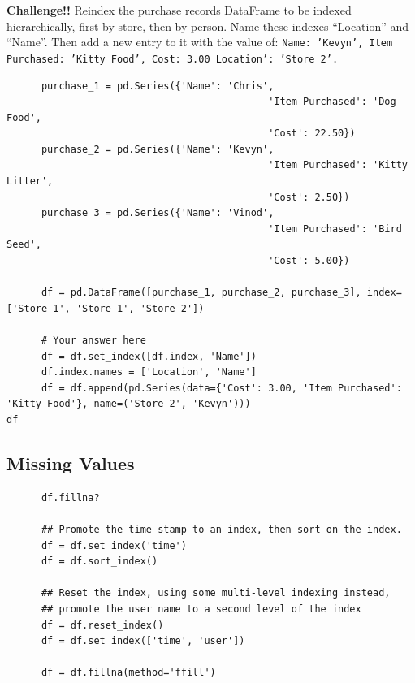 \documentclass[11pt]{article}
\begin{document}
    {\bf Challenge!!}
    Reindex the purchase records DataFrame to be indexed
    hierarchically, first by store, then by person. Name these indexes
    ``Location'' and ``Name''. Then add a new entry to it with the value
    of: 
    {\tt Name: 'Kevyn', Item Purchased: 'Kitty Food', Cost: 3.00 Location': 'Store 2'.}
    \begin{lstlisting}
      purchase_1 = pd.Series({'Name': 'Chris',
                                             'Item Purchased': 'Dog Food',
                                             'Cost': 22.50})
      purchase_2 = pd.Series({'Name': 'Kevyn',
                                             'Item Purchased': 'Kitty Litter',
                                             'Cost': 2.50})
      purchase_3 = pd.Series({'Name': 'Vinod',
                                             'Item Purchased': 'Bird Seed',
                                             'Cost': 5.00})

      df = pd.DataFrame([purchase_1, purchase_2, purchase_3], index=['Store 1', 'Store 1', 'Store 2'])

      # Your answer here
      df = df.set_index([df.index, 'Name'])
      df.index.names = ['Location', 'Name']
      df = df.append(pd.Series(data={'Cost': 3.00, 'Item Purchased': 'Kitty Food'}, name=('Store 2', 'Kevyn')))
df
    \end{lstlisting}


    \subsection{Missing Values}
    \begin{lstlisting}
      df.fillna?

      ## Promote the time stamp to an index, then sort on the index. 
      df = df.set_index('time')
      df = df.sort_index()

      ## Reset the index, using some multi-level indexing instead,
      ## promote the user name to a second level of the index
      df = df.reset_index()
      df = df.set_index(['time', 'user'])

      df = df.fillna(method='ffill')
    \end{lstlisting}
\end{document}
